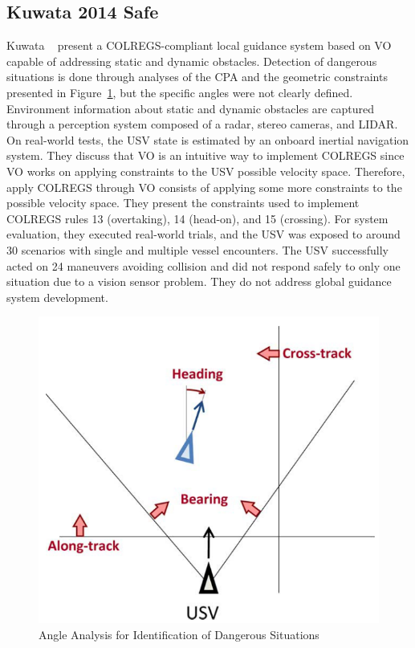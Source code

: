     \subsection{Kuwata 2014 Safe}
    Kuwata \etal~\cite{Kuwata2014Safe} present a \ac{COLREGS}-compliant local guidance system based on \ac{VO} capable of addressing static and dynamic obstacles. Detection of dangerous situations is done through analyses of the \ac{CPA} and the geometric constraints presented in Figure~\ref{fig:Kuwata2014Safe_GeometricConstraints}, but the specific angles were not clearly defined. Environment information about static and dynamic obstacles are captured through a perception system composed of a radar, stereo cameras, and \ac{LIDAR}. On real-world tests, the \ac{USV} state is estimated by an onboard inertial navigation system. They discuss that \ac{VO} is an intuitive way to implement \ac{COLREGS} since \ac{VO} works on applying constraints to the \ac{USV} possible velocity space. Therefore, apply \ac{COLREGS} through \ac{VO} consists of applying some more constraints to the possible velocity space. They present the constraints used to implement \ac{COLREGS} rules 13 (overtaking), 14 (head-on), and 15 (crossing). For system evaluation, they executed real-world trials, and the \ac{USV} was exposed to around 30 scenarios with single and multiple vessel encounters. The \ac{USV} successfully acted on 24 maneuvers avoiding collision and did not respond safely to only one situation due to a vision sensor problem. They do not address global guidance system development.
    
    \begin{figure}[H]
        \centering
        \includegraphics[scale=0.4]{figs/Chap3/Kuwata2014Safe_GeometricConstraints.png}
        \caption{Angle Analysis for Identification of Dangerous Situations \cite{Kuwata2014Safe}}
        \label{fig:Kuwata2014Safe_GeometricConstraints}
    \end{figure}
    
